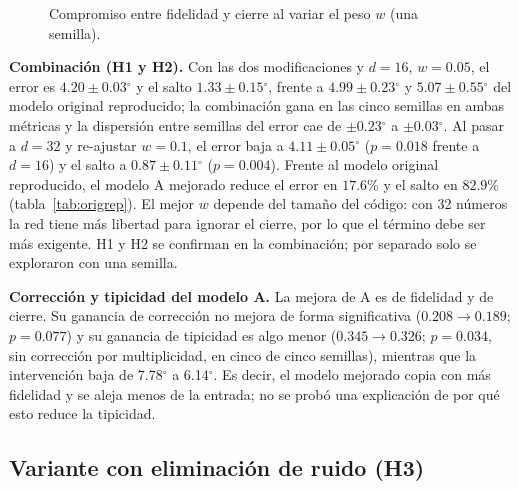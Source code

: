 \documentclass[11pt,a4paper]{amsart}
\newcommand{\gr}{$^{\circ}$}
\begin{document}
\begin{figure}[h]
\centering
{}
\caption{Compromiso entre fidelidad y cierre al variar el peso $w$ (una semilla).}
\label{fig:w}
\end{figure}

\textbf{Combinación (H1 y H2).} Con las dos modificaciones y $d=16$, $w=0.05$, el error es $4.20\pm0.03$\gr{} y el salto $1.33\pm0.15$\gr{}, frente a $4.99\pm0.23$\gr{} y $5.07\pm0.55$\gr{} del modelo original reproducido; la combinación gana en las cinco semillas en ambas métricas y la dispersión entre semillas del error cae de $\pm0.23$\gr{} a $\pm0.03$\gr{}. Al pasar a $d=32$ y re-ajustar $w=0.1$, el error baja a $4.11\pm0.05$\gr{} ($p=0.018$ frente a $d=16$) y el salto a $0.87\pm0.11$\gr{} ($p=0.004$). Frente al modelo original reproducido, el modelo A mejorado reduce el error en $17.6\%$ y el salto en $82.9\%$ (tabla~\ref{tab:origrep}). El mejor $w$ depende del tamaño del código: con 32 números la red tiene más libertad para ignorar el cierre, por lo que el término debe ser más exigente. H1 y H2 se confirman en la combinación; por separado solo se exploraron con una semilla.

\textbf{Corrección y tipicidad del modelo A.} La mejora de A es de fidelidad y de cierre. Su ganancia de corrección no mejora de forma significativa ($0.208\to0.189$; $p=0.077$) y su ganancia de tipicidad es algo menor ($0.345\to0.326$; $p=0.034$, sin corrección por multiplicidad, en cinco de cinco semillas), mientras que la intervención baja de 7.78\gr{} a 6.14\gr. Es decir, el modelo mejorado copia con más fidelidad y se aleja menos de la entrada; no se probó una explicación de por qué esto reduce la tipicidad.

\subsection{Variante con eliminación de ruido (H3)}
\end{document}
